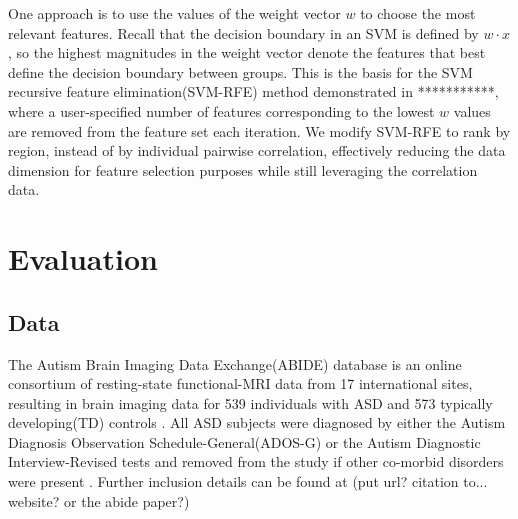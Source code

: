\documentclass{llncs}
\begin{document}
One approach is to use the values of the weight vector $w$ to choose the most relevant features.  Recall that the decision boundary in an SVM is defined by $w \cdot x$, so the highest magnitudes in the weight vector denote the features that best define the decision boundary between groups. This is the basis for the SVM recursive feature elimination(SVM-RFE) method demonstrated in ***********, where a user-specified number of features corresponding to the lowest $w$ values are removed from the feature set each iteration. We modify SVM-RFE to rank by region, instead of by individual pairwise correlation, effectively reducing the data dimension for feature selection purposes while still leveraging the correlation data. 
\section{Evaluation}
\subsection{Data}
The Autism Brain Imaging Data Exchange(ABIDE) database is an online consortium of resting-state functional-MRI data from 17 international sites, resulting in brain imaging data for 539 individuals with ASD and 573 typically developing(TD)  controls \cite{abide}. All ASD subjects were diagnosed by either the Autism Diagnosis Observation Schedule-General(ADOS-G) or the Autism Diagnostic Interview-Revised tests and removed from the study if other co-morbid disorders were present \cite{lordADOS} \cite{lordADIR} \cite{abide}.  Further inclusion details can be found at (put url? citation to... website? or the abide paper?)
\end{document}
